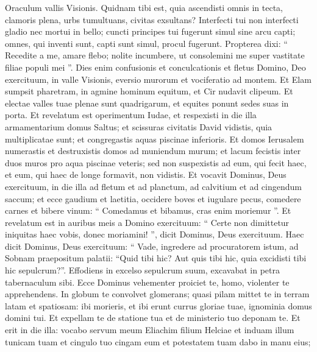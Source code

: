 \begin{biblechapter}
\begin{biblechapter}
\begin{biblechapter}
\begin{biblechapter}
\begin{biblechapter}
\begin{biblechapter}
\begin{biblechapter}
\begin{biblechapter}
\begin{biblechapter}
\begin{biblechapter}
\begin{biblechapter}
\begin{biblechapter}
\begin{biblechapter}
\begin{biblechapter}
\begin{biblechapter}
\begin{biblechapter}
\begin{biblechapter}
\begin{biblechapter}
\begin{biblechapter}
\begin{biblechapter}
\begin{biblechapter}
\begin{biblechapter}
\verse Oraculum vallis Visionis.
 Quidnam tibi est,
 quia ascendisti omnis in tecta,
 \verse clamoris plena, urbs tumultuans,
 civitas exsultans?
 Interfecti tui non interfecti gladio
 nec mortui in bello;
 \verse cuncti principes tui fugerunt
 simul sine arcu capti;
 omnes, qui inventi sunt, capti sunt simul,
 procul fugerunt.
 \verse Propterea dixi: “ Recedite a me,
 amare flebo;
 nolite incumbere, ut consolemini me
 super vastitate filiae populi mei ”.
 \verse Dies enim confusionis
 et conculcationis et fletus
 Domino, Deo exercituum, in valle Visionis,
 eversio murorum et vociferatio ad montem.
 \verse Et Elam sumpsit pharetram,
 in agmine hominum equitum,
 et Cir nudavit clipeum.
 \verse Et electae valles tuae
 plenae sunt quadrigarum,
 et equites ponunt sedes suas in porta.
 \verse Et revelatum est operimentum Iudae,
 et respexisti in die illa armamentarium domus Saltus;
 \verse et scissuras civitatis David vidistis,
 quia multiplicatae sunt;
 et congregastis aquas piscinae inferioris.
 \verse Et domos Ierusalem numerastis
 et destruxistis domos
 ad muniendum murum;
 \verse et lacum fecistis inter duos muros
 pro aqua piscinae veteris;
 sed non suspexistis ad eum, qui fecit haec,
 et eum, qui haec de longe formavit, non vidistis.
 \verse Et vocavit Dominus, Deus exercituum, in die illa
 ad fletum et ad planctum,
 ad calvitium et ad cingendum saccum;
 \verse et ecce gaudium et laetitia,
 occidere boves et iugulare pecus,
 comedere carnes et bibere vinum:
 “ Comedamus et bibamus,
 cras enim moriemur ”.
 \verse Et revelatum est in auribus meis
 a Domino exercituum:
 “ Certe non dimittetur iniquitas haec vobis, donec moriamini! ”,
 dicit Dominus, Deus exercituum.
 \verse Haec dicit Dominus, Deus exercituum:
 “ Vade, ingredere ad procuratorem istum,
 ad Sobnam praepositum palatii:
 \verse “Quid tibi hic? Aut quis tibi hic,
 quia excidisti tibi hic sepulcrum?”.
 Effodiens in excelso sepulcrum suum,
 excavabat in petra tabernaculum sibi.
 \verse Ecce Dominus vehementer proiciet te, homo,
 violenter te apprehendens.
 \verse In globum te convolvet glomerans;
 quasi pilam mittet te
 in terram latam et spatiosam:
 ibi morieris,
 et ibi erunt currus gloriae tuae,
 ignominia domus domini tui.
 \verse Et expellam te de statione tua
 et de ministerio tuo deponam te.
 \verse Et erit in die illa:
 vocabo servum meum Eliachim filium Helciae
 \verse et induam illum tunicam tuam
 et cingulo tuo cingam eum
 et potestatem tuam dabo in manu eius;

\end{biblechapter}
\end{biblechapter}
\end{biblechapter}
\end{biblechapter}
\end{biblechapter}
\end{biblechapter}
\end{biblechapter}
\end{biblechapter}
\end{biblechapter}
\end{biblechapter}
\end{biblechapter}
\end{biblechapter}
\end{biblechapter}
\end{biblechapter}
\end{biblechapter}
\end{biblechapter}
\end{biblechapter}
\end{biblechapter}
\end{biblechapter}
\end{biblechapter}
\end{biblechapter}
\end{biblechapter}
